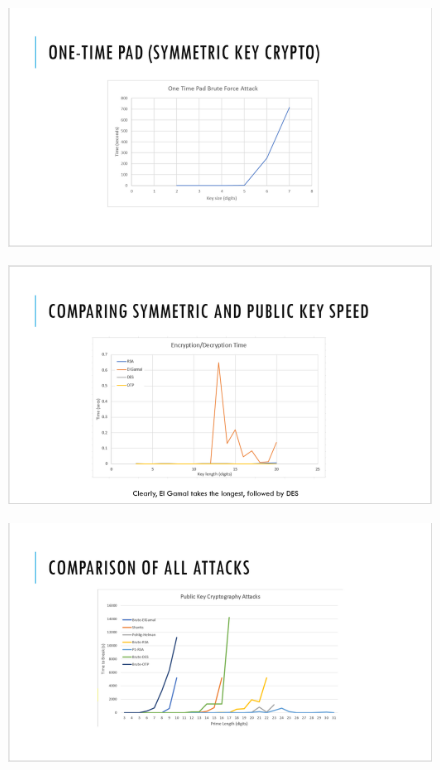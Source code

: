 \documentclass[12pt]{report}
\begin{document}
\begin{figure}[hp!] %
    \begin{center}
        \includegraphics[width=0.85\linewidth]{Pictures/slide8.PNG}
        \label{fig:slide8}
    \end{center}
\end{figure}

\begin{figure}[hp!] %
    \begin{center}
        \includegraphics[width=0.85\linewidth]{Pictures/slide9.PNG}
        \label{fig:slide9}
    \end{center}
\end{figure}

\begin{figure}[hp!] %
    \begin{center}
        \includegraphics[width=0.85\linewidth]{Pictures/slide10.PNG}
        \label{fig:slide10}
    \end{center}
\end{figure}
\end{document}
